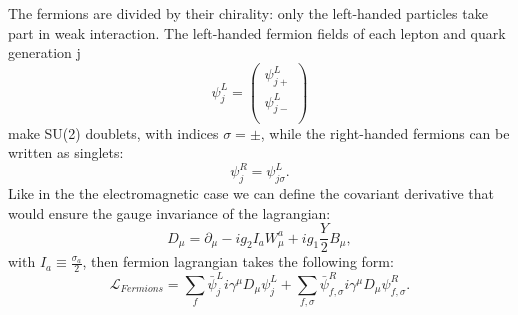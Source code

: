 The fermions are divided by their chirality: only the left-handed particles take part in weak interaction. The left-handed fermion fields of each lepton and quark generation j
  \begin{equation}
    \psi^L_j = \begin{pmatrix}
	\psi^L_{j+}  \\
	\psi^L_{j-}  \\
\end{pmatrix}
  \end{equation}
make SU(2) doublets, with indices $\sigma=\pm$, while the right-handed fermions can be written as singlets:
 \begin{equation}
\psi^R_j = \psi^L_{j\sigma}.  
\end{equation}
Like in the the electromagnetic case we can define the covariant derivative that would ensure the gauge invariance of the lagrangian:
 \begin{equation}
D_\mu = \partial_{\mu} - ig_2I_aW^a_{\mu}+ig_1\frac{Y}{2}B_{\mu},
\end{equation}
with $I_a \equiv \frac{\sigma_a}{2}$, then fermion lagrangian takes the following form:
 \begin{equation}
\mathcal{L}_{Fermions} = \sum_f \bar \psi^L_j i \gamma^{\mu}D_{\mu}\psi^L_j +\sum_{f,\sigma} \bar \psi^R_{f,\sigma}  i \gamma^{\mu}D_{\mu}\psi^R_{f,\sigma}  .
\end{equation}

